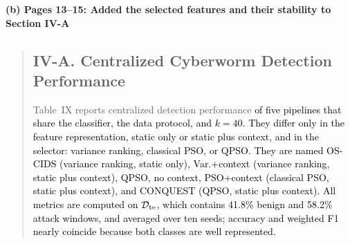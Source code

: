 \documentclass[11pt]{article}
\newenvironment{excerpt}{\begin{quote}\sloppy}{\end{quote}}
\newcommand{\mshead}[2]{\subsection*{\textbf{#1. #2}}}
\newcommand{\loc}[1]{\par\medskip\noindent\textbf{#1}\par}
\begin{document}
\loc{(b) Pages 13--15: Added the selected features and their stability to Section IV-A}
\begin{excerpt}
\mshead{IV-A}{Centralized Cyberworm Detection Performance}


Table~IX reports centralized detection
performance \textcolor{black}{of five pipelines that share the
classifier, the data protocol, and $k=40$. They differ only in the
feature representation, static only or static plus context, and in
the selector: variance ranking, classical PSO, or QPSO. They are named
OS-CIDS (variance ranking, static only), Var.+context (variance
ranking, static plus context), QPSO, no context, PSO+context
(classical PSO, static plus context), and CONQUEST (QPSO, static plus
context). All metrics
are computed on $\mathcal{D}_{\rm te}$, which contains 41.8\% benign
and 58.2\% attack windows, and averaged over ten seeds; accuracy and
weighted F1 nearly coincide because both classes are well
represented.}

\setcounter{table}{8}
\begin{table}[H]
\centering
\caption{\textcolor{black}{Centralized detection over ten seeds, with Wilcoxon p-values against CONQUEST. \textsuperscript{\textdagger}Conference result~{[9]}, not directly comparable.}}

\color{black}
\setlength{\tabcolsep}{3pt}
\end{table}


\end{excerpt}
\end{document}
